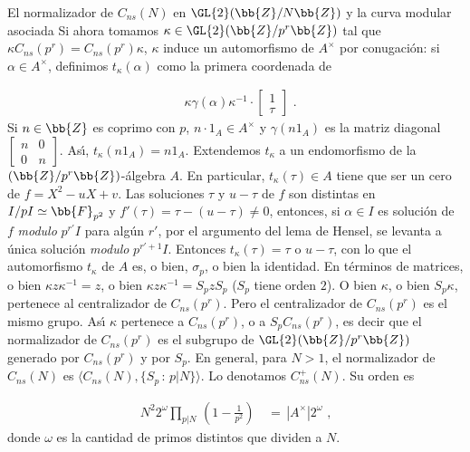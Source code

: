 \begin{subsection}{El normalizador de $C_{ns}(N)$ en $\GL{2}(\bb{Z}/N\bb{Z})$%
			y la curva modular asociada}
Si ahora tomamos $\kappa\in\GL{2}(\bb{Z}/p^{r}\bb{Z})$ tal que
$\kappa C_{ns}(p^{r})=C_{ns}(p^{r})\kappa$, $\kappa$ induce un automorfismo de
$A^{\times}$ por conugaci\'{o}n: si $\alpha\in A^{\times}$, definimos
$t_{\kappa}(\alpha)$ como la primera coordenada de

\begin{align*}
 & \kappa\gamma(\alpha)\kappa^{-1}\cdot\begin{bmatrix}1\\ \tau\end{bmatrix}
 \text{ .}
\end{align*}
Si $n\in\bb{Z}$ es coprimo con $p$, $n\cdot 1_{A}\in A^{\times}$ y
$\gamma(n1_{A})$ es la matriz diagonal
\begin{math}
\left[\begin{smallmatrix} n&0\\0&n\end{smallmatrix}\right]
\end{math}.
As\'{\i}, $t_{\kappa}(n1_{A})=n1_{A}$. Extendemos $t_{\kappa}$ a un endomorfismo
de la $(\bb{Z}/p^{r}\bb{Z})$-\'{a}lgebra $A$. En particular,
$t_{\kappa}(\tau)\in A$ tiene que ser un cero de $f=X^{2}-uX+v$. Las soluciones
$\tau$ y $u-\tau$ de $f$ son distintas en $I/pI\simeq\bb{F}_{p^{2}}$ y
$f'(\tau)=\tau-(u-\tau)\not =0$, entonces,
si $\alpha\in I$ es soluci\'{o}n de $f$ \textit{modulo} $p^{r'}I$ para alg\'{u}n
$r'$, por el argumento del lema de Hensel, se levanta a \'{u}nica soluci\'{o}n
\textit{modulo} $p^{r'+1}I$. Entonces $t_{\kappa}(\tau)=\tau$ o $u-\tau$, con lo
que el automorfismo $t_{\kappa}$ de $A$ es, o bien, $\sigma_{p}$, o bien la
identidad. En t\'{e}rminos de matrices, o bien $\kappa z\kappa^{-1}=z$, o bien
$\kappa z\kappa^{-1}=S_{p}zS_{p}$ ($S_{p}$ tiene orden $2$). O bien $\kappa$,
o bien $S_{p}\kappa$, pertenece al centralizador de $C_{ns}(p^{r})$. Pero el
centralizador de $C_{ns}(p^{r})$ es el mismo grupo. As\'{\i}
$\kappa$ pertenece a $C_{ns}(p^{r})$, o a $S_{p}C_{ns}(p^{r})$, es decir que el
normalizador de $C_{ns}(p^{r})$ es el subgrupo de $\GL{2}(\bb{Z}/p^{r}\bb{Z})$
generado por $C_{ns}(p^{r})$ y por $S_{p}$. En general, para $N>1$,
el normalizador de $C_{ns}(N)$ es $\langle C_{ns}(N),\{S_{p}\,:\,p|N\} \rangle$.
Lo denotamos $C_{ns}^{+}(N)$. Su orden es

\begin{align*}
N^{2}2^{\omega}\prod_{p|N}\,\left(1-\frac{1}{p^{2}}\right) &
\,=\,|A^{\times}|2^{\omega}\text{ ,}
\end{align*}
donde $\omega$ es la cantidad de primos distintos que dividen a $N$.


\end{subsection}
